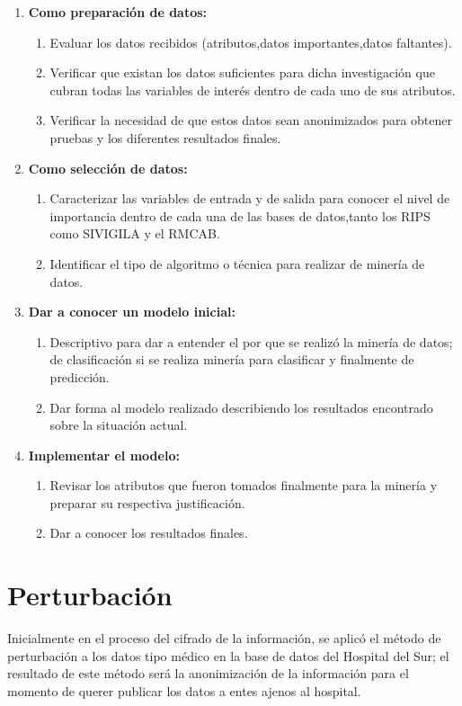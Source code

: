 \documentclass[a4paper,openright,12pt]{book}
\theoremstyle{definition}
\theoremstyle{remark}
\begin{document}
\begin{enumerate}
	\item \textbf{Como preparación de datos:}
    \begin{enumerate}
		\item Evaluar los datos recibidos (atributos,datos importantes,datos faltantes).
    	\item Verificar que existan los datos suficientes para dicha investigación que cubran todas las variables de interés dentro de cada uno de sus atributos.
    	\item Verificar la necesidad de que estos datos sean anonimizados para obtener pruebas y los diferentes resultados finales.
	\end{enumerate}
    \item \textbf{Como selección de datos:}
    \begin{enumerate}
		\item Caracterizar las variables de entrada y de salida para conocer el nivel de importancia dentro de cada una de las bases de datos,tanto los RIPS como SIVIGILA y el RMCAB.
    	\item Identificar el tipo de algoritmo o técnica para realizar de minería de datos.
	\end{enumerate}
    \item \textbf{Dar a conocer un modelo inicial:}
     \begin{enumerate}
		\item Descriptivo para dar a entender el por que se realizó la minería de datos; de clasificación si se realiza minería para clasificar y finalmente de predicción.
    	\item Dar forma al modelo realizado describiendo  los resultados encontrado sobre la situación actual.
	\end{enumerate}
    \item \textbf{Implementar el modelo:}
      \begin{enumerate}
		\item Revisar los atributos que fueron tomados finalmente para la minería y preparar su respectiva justificación.
    	\item Dar a conocer los resultados finales.
	\end{enumerate}
\end{enumerate}

\section{Perturbación}
Inicialmente en el proceso del cifrado de la información, se aplicó el método de perturbación a los datos tipo médico en la base de datos del Hospital del Sur; el resultado de este método será la anonimización de la información para el momento de querer publicar los datos a entes ajenos al hospital.
\end{document}
